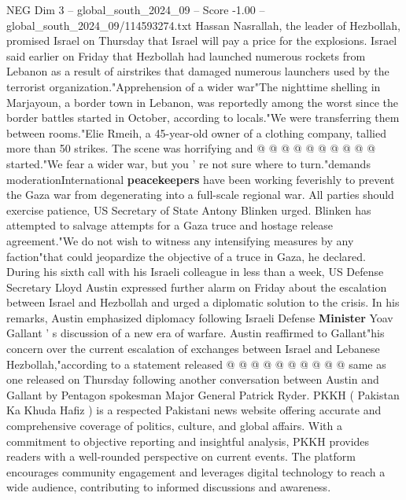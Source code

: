 \begin{textsample}{NEG Dim 3 – global\_south\_2024\_09 – Score -1.00 – global\_south\_2024\_09/114593274.txt}
Hassan Nasrallah, the leader of Hezbollah, promised Israel on Thursday that Israel will pay a price for the explosions.
Israel said earlier on Friday that Hezbollah had launched numerous rockets from Lebanon as a result of airstrikes that damaged numerous launchers used by the terrorist organization."Apprehension of a wider war"The nighttime shelling in Marjayoun, a border town in Lebanon, was reportedly among the worst since the border battles started in October, according to locals."We were transferring them between rooms."Elie Rmeih, a 45-year-old owner of a clothing company, tallied more than 50 strikes.
The scene was horrifying and @ @ @ @ @ @ @ @ @ @ started."We fear a wider war, but you ' re not sure where to turn."demands moderationInternational \textbf{peacekeepers} have been working feverishly to prevent the Gaza war from degenerating into a full-scale regional war.
All parties should exercise patience, US Secretary of State Antony Blinken urged.
Blinken has attempted to salvage attempts for a Gaza truce and hostage release agreement."We do not wish to witness any intensifying measures by any faction"that could jeopardize the objective of a truce in Gaza, he declared.
During his sixth call with his Israeli colleague in less than a week, US Defense Secretary Lloyd Austin expressed further alarm on Friday about the escalation between Israel and Hezbollah and urged a diplomatic solution to the crisis.
In his remarks, Austin emphasized diplomacy following Israeli Defense \textbf{Minister} Yoav Gallant ' s discussion of a new era of warfare.
Austin reaffirmed to Gallant"his concern over the current escalation of exchanges between Israel and Lebanese Hezbollah,"according to a statement released @ @ @ @ @ @ @ @ @ @ same as one released on Thursday following another conversation between Austin and Gallant by Pentagon spokesman Major General Patrick Ryder.
PKKH ( Pakistan Ka Khuda Hafiz ) is a respected Pakistani news website offering accurate and comprehensive coverage of politics, culture, and global affairs.
With a commitment to objective reporting and insightful analysis, PKKH provides readers with a well-rounded perspective on current events.
The platform encourages community engagement and leverages digital technology to reach a wide audience, contributing to informed discussions and awareness.

\end{textsample}
